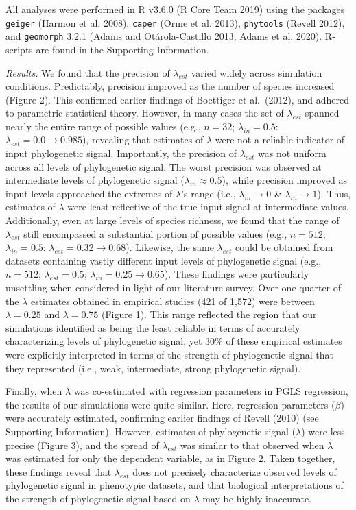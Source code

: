 \documentclass[
]{article}
\begin{document}
All analyses were performed in R v3.6.0 (R Core Team 2019) using the
packages \texttt{geiger} (Harmon et al. 2008), \texttt{caper} (Orme et
al. 2013), \texttt{phytools} (Revell 2012), and \texttt{geomorph} 3.2.1
(Adams and Otárola-Castillo 2013; Adams et al. 2020). R-scripts are
found in the Supporting Information. \hfill\break

\emph{Results.} We found that the precision of \(\lambda_{est}\) varied
widely across simulation conditions. Predictably, precision improved as
the number of species increased (Figure 2). This confirmed earlier
findings of Boettiger et al.~(2012), and adhered to parametric
statistical theory. However, in many cases the set of \(\lambda_{est}\)
spanned nearly the entire range of possible values (e.g., \(n=32\);
\(\lambda_{in}=0.5\): \(\lambda_{est}= 0.0\to 0.985\)), revealing that
estimates of \(\lambda\) were not a reliable indicator of input
phylogenetic signal. Importantly, the precision of \(\lambda_{est}\) was
not uniform across all levels of phylogenetic signal. The worst
precision was observed at intermediate levels of phylogenetic signal
(\(\lambda_{in}\approx0.5\)), while precision improved as input levels
approached the extremes of \(\lambda\)'s range (i.e.,
\(\lambda_{in}\rightarrow0\) \& \(\lambda_{in}\rightarrow1\)). Thus,
estimates of \(\lambda\) were least reflective of the true input signal
at intermediate values. Additionally, even at large levels of species
richness, we found that the range of \(\lambda_{est}\) still encompassed
a substantial portion of possible values (e.g., \(n=512\);
\(\lambda_{in}=0.5\): \(\lambda_{est} = 0.32\to 0.68\)). Likewise, the
same \(\lambda_{est}\) could be obtained from datasets containing vastly
different input levels of phylogenetic signal (e.g., \(n=512\);
\(\lambda_{est} = 0.5\); \(\lambda_{in} = 0.25 \to 0.65\)). These
findings were particularly unsettling when considered in light of our
literature survey. Over one quarter of the \(\lambda\) estimates
obtained in empirical studies (421 of 1,572) were between
\(\lambda=0.25\) and \(\lambda=0.75\) (Figure 1). This range reflected
the region that our simulations identified as being the least reliable
in terms of accurately characterizing levels of phylogenetic signal, yet
30\% of these empirical estimates were explicitly interpreted in terms
of the strength of phylogenetic signal that they represented (i.e.,
weak, intermediate, strong phylogenetic signal). \hfill\break

Finally, when \(\lambda\) was co-estimated with regression parameters in
PGLS regression, the results of our simulations were quite similar.
Here, regression parameters (\(\beta\)) were accurately estimated,
confirming earlier findings of Revell (2010) (see Supporting
Information). However, estimates of phylogenetic signal (\(\lambda\))
were less precise (Figure 3), and the spread of \(\lambda_{est}\) was
similar to that observed when \(\lambda\) was estimated for only the
dependent variable, as in Figure 2. Taken together, these findings
reveal that \(\lambda_{est}\) does not precisely characterize observed
levels of phylogenetic signal in phenotypic datasets, and that
biological interpretations of the strength of phylogenetic signal based
on \(\lambda\) may be highly inaccurate. \hfill\break
\end{document}
